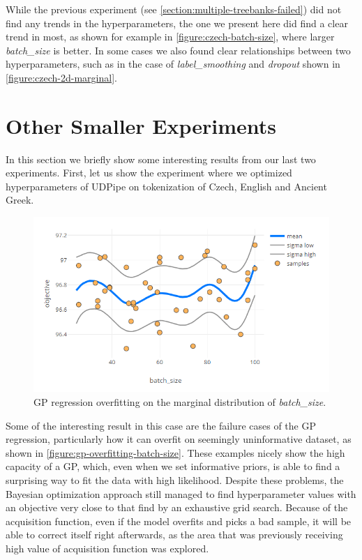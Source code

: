 While the previous experiment (see \autoref{section:multiple-treebanks-failed}) did not find any trends in the hyperparameters, the one we present here did find a clear trend in most, as shown for example in \autoref{figure:czech-batch-size}, where larger \emph{batch\_size} is better. In some cases we also found clear relationships between two hyperparameters, such as in the case of \emph{label\_smoothing} and \emph{dropout} shown in \autoref{figure:czech-2d-marginal}.


\section{Other Smaller Experiments}

In this section we briefly show some interesting results from our last two experiments. First, let us show the experiment where we optimized hyperparameters of UDPipe \citep{udpipe:2017} on tokenization of Czech, English and Ancient Greek.

\begin{figure}
	\begin{center}
		\includegraphics[width=1.0\textwidth]{images/gp-overfitting-batch-size.png}
		\caption{GP regression overfitting on the marginal distribution of \emph{batch\_size}.}
		\label{figure:gp-overfitting-batch-size}
	\end{center}
\end{figure}

Some of the interesting result in this case are the failure cases of the GP regression, particularly how it can overfit on seemingly uninformative dataset, as shown in \autoref{figure:gp-overfitting-batch-size}. These examples nicely show the high capacity of a GP, which, even when we set informative priors, is able to find a surprising way to fit the data with high likelihood. Despite these problems, the Bayesian optimization approach still managed to find hyperparameter values with an objective very close to that find by an exhaustive grid search. Because of the acquisition function, even if the model overfits and picks a bad sample, it will be able to correct itself right afterwards, as the area that was previously receiving high value of acquisition function was explored.

